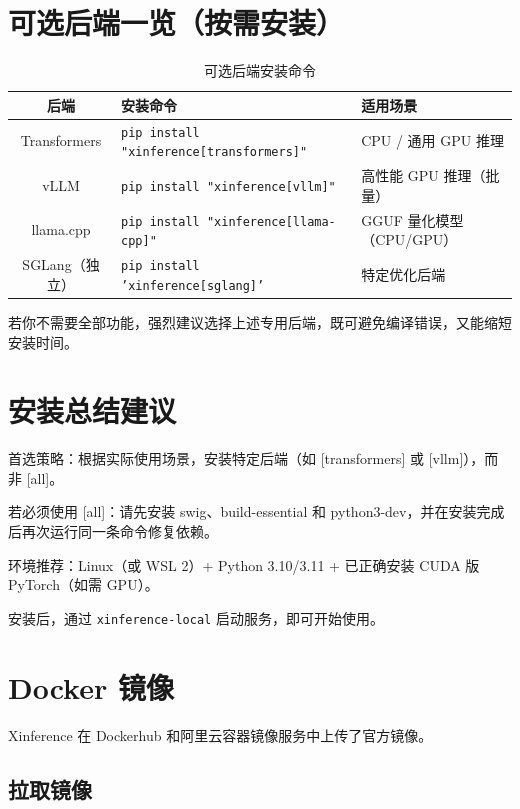 \documentclass[12pt,UTF8]{ctexbook}
\begin{document}
\section{可选后端一览（按需安装）}
\label{sec:backend_summary}

\begin{table}[htbp]
    \centering
    \caption{可选后端安装命令}
    \begin{tabular}{|c|p{5cm}|p{5cm}|}
        \hline
        \textbf{后端} & \textbf{安装命令} & \textbf{适用场景} \\
        \hline
        Transformers & \texttt{pip install "xinference[transformers]"} & CPU / 通用 GPU 推理 \\
        \hline
        vLLM & \texttt{pip install "xinference[vllm]"} & 高性能 GPU 推理（批量） \\
        \hline
        llama.cpp & \texttt{pip install "xinference[llama-cpp]"} & GGUF 量化模型（CPU/GPU） \\
        \hline
        SGLang（独立） & \texttt{pip install 'xinference[sglang]'} & 特定优化后端 \\
        \hline
    \end{tabular}
\end{table}

若你不需要全部功能，强烈建议选择上述专用后端，既可避免编译错误，又能缩短安装时间。

\section{安装总结建议}
\label{sec:installation_summary}

首选策略：根据实际使用场景，安装特定后端（如 [transformers] 或 [vllm]），而非 [all]。

若必须使用 [all]：请先安装 swig、build-essential 和 python3-dev，并在安装完成后再次运行同一条命令修复依赖。

环境推荐：Linux（或 WSL 2）+ Python 3.10/3.11 + 已正确安装 CUDA 版 PyTorch（如需 GPU）。

安装后，通过 \texttt{xinference-local} 启动服务，即可开始使用。

\section{Docker 镜像}
\label{sec:docker_install}

Xinference 在 Dockerhub 和阿里云容器镜像服务中上传了官方镜像。

\subsection{拉取镜像}
\end{document}
